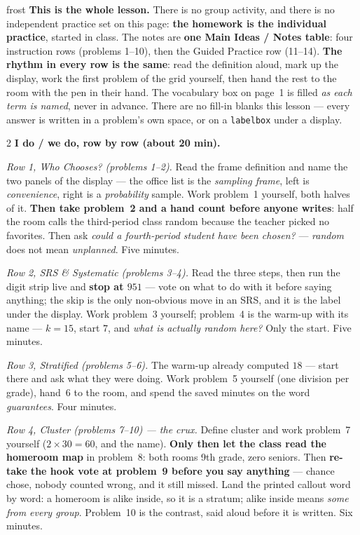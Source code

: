 \documentclass[10pt]{article}
\begin{document}
\boxguard
\begin{skillbox}{frost}
\textbf{This is the whole lesson.} There is no group activity, and there is no independent
practice set on this page: \textbf{the homework is the individual practice}, started in class.
The notes are \textbf{one Main Ideas / Notes table}: four instruction rows (problems 1--10),
then the Guided Practice row (11--14). \textbf{The rhythm in every row is the same}: read the
definition aloud, mark up the display, work the first problem of the grid yourself, then hand
the rest to the room with the pen in their hand. The vocabulary box on page~1 is filled
\emph{as each term is named}, never in advance. There are no fill-in blanks this lesson ---
every answer is written in a problem's own space, or on a \texttt{labelbox} under a display.
\begin{multicols}{2}
\textbf{I do / we do, row by row (about 20 min).}

\emph{Row 1, Who Chooses? (problems 1--2).} Read the frame definition and name the two panels
of the display --- the office list is the \emph{sampling frame}, left is \emph{convenience},
right is a \emph{probability} sample. Work problem~1 yourself, both halves of it.
\textbf{Then take problem~2 and a hand count before anyone writes}: half the room calls
the third-period class random because the teacher picked no favorites. Then ask \emph{could a
fourth-period student have been chosen?} --- \emph{random} does not mean \emph{unplanned}.
Five minutes.

\emph{Row 2, SRS \& Systematic (problems 3--4).} Read the three steps, then run the digit strip
live and \textbf{stop at $951$} --- vote on what to do with it before saying anything; the skip
is the only non-obvious move in an SRS, and it is the label under the display. Work problem~3
yourself; problem~4 is the warm-up with its name --- $k = 15$, start $7$, and \emph{what is
actually random here?} Only the start. Five minutes.

\emph{Row 3, Stratified (problems 5--6).} The warm-up already computed $18$ --- start there
and ask what they were doing. Work problem~5 yourself (one division per grade), hand~6 to the
room, and spend the saved minutes on the word \emph{guarantees}. Four minutes.

\emph{Row 4, Cluster (problems 7--10) --- the crux.} Define cluster and work problem~7
yourself ($2 \times 30 = 60$, and the name). \textbf{Only then let the class read the homeroom
map} in problem~8: both rooms 9th grade, zero seniors. Then \textbf{re-take the hook vote at
problem~9 before you say anything} --- chance chose, nobody counted wrong, and it still
missed. Land the printed callout word by word: a homeroom is alike inside, so it is a stratum;
alike inside means \emph{some from every group}. Problem~10 is the contrast, said aloud before
it is written. Six minutes.


\end{multicols}
\end{skillbox}
\end{document}
